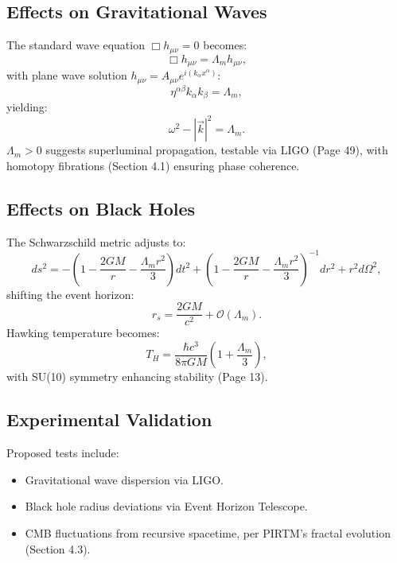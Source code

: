 \documentclass{article}
\theoremstyle{plain}
\begin{document}
\subsection{Effects on Gravitational Waves}
The standard wave equation \( \Box h_{\mu\nu} = 0 \) becomes:
\begin{equation}
\Box h_{\mu\nu} = \Lambda_m h_{\mu\nu},
\end{equation}
with plane wave solution \( h_{\mu\nu} = A_{\mu\nu} e^{i (k_\alpha x^\alpha)} \):
\begin{equation}
\eta^{\alpha\beta} k_\alpha k_\beta = \Lambda_m,
\end{equation}
yielding:
\begin{equation}
\omega^2 - |\vec{k}|^2 = \Lambda_m.
\end{equation}
\(\Lambda_m > 0\) suggests superluminal propagation, testable via LIGO (Page 49), with homotopy fibrations (Section 4.1) ensuring phase coherence.

\subsection{Effects on Black Holes}
The Schwarzschild metric adjusts to:
\begin{equation}
ds^2 = -\left(1 - \frac{2GM}{r} - \frac{\Lambda_m r^2}{3}\right) dt^2 + \left(1 - \frac{2GM}{r} - \frac{\Lambda_m r^2}{3}\right)^{-1} dr^2 + r^2 d\Omega^2,
\end{equation}
shifting the event horizon:
\begin{equation}
r_s = \frac{2GM}{c^2} + \mathcal{O}(\Lambda_m).
\end{equation}
Hawking temperature becomes:
\begin{equation}
T_H = \frac{\hbar c^3}{8\pi G M} \left(1 + \frac{\Lambda_m}{3}\right),
\end{equation}
with SU(10) symmetry enhancing stability (Page 13).

\subsection{Experimental Validation}
Proposed tests include:
\begin{itemize}
    \item Gravitational wave dispersion via LIGO.
    \item Black hole radius deviations via Event Horizon Telescope.
    \item CMB fluctuations from recursive spacetime, per PIRTM’s fractal evolution (Section 4.3).
\end{itemize}
\end{document}
